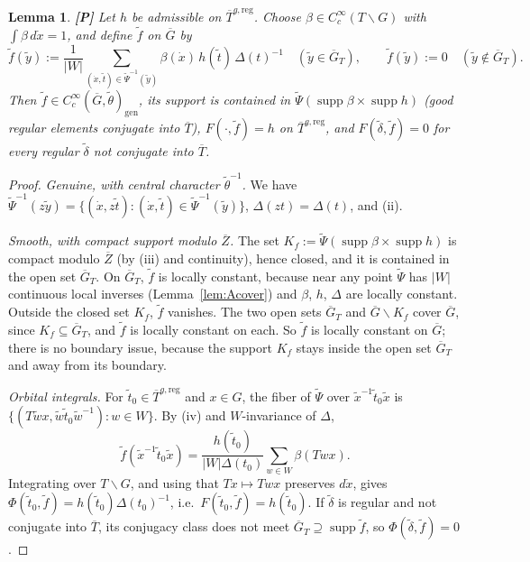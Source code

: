 \documentclass[12pt]{article}
\newcommand{\ov}[1]{\overline{#1}}
\newcommand{\gen}{\mathrm{gen}}
\newcommand{\reg}{\mathrm{reg}}
\newcommand{\supp}{\operatorname{supp}}
\newcommand{\Gb}{\ov{G}}
\newcommand{\Zb}{\ov{Z}}
\newcommand{\Tb}{\ov{T}}
\newcommand{\Pv}{\textbf{[P]}}
\theoremstyle{plain}
\newtheorem{lemma}[theorem]{Lemma}
\theoremstyle{definition}
\begin{document}
\begin{lemma}\label{lem:Arealize}\Pv
Let $h$ be admissible on $\Tb^{g,\reg}$. Choose $\beta\in C_c^\infty(T\backslash G)$ with $\int\beta\,d\dot x=1$, and define $\tilde f$ on $\Gb$ by
\[ \tilde f(\tilde y):=\frac1{|W|}\sum_{(\dot x,\tilde t)\in\tilde\Psi^{-1}(\tilde y)}\beta(\dot x)\,h(\tilde t)\,\Delta(t)^{-1}\quad(\tilde y\in\Gb_T),\qquad\tilde f(\tilde y):=0\quad(\tilde y\notin\Gb_T). \]
Then $\tilde f\in C_c^\infty(\Gb,\tilde\theta)_\gen$, its support is contained in $\tilde\Psi(\supp\beta\times\supp h)$ (good regular elements conjugate into $\Tb$), $F(\cdot,\tilde f)=h$ on $\Tb^{g,\reg}$, and $F(\tilde\delta,\tilde f)=0$ for every regular $\tilde\delta$ not conjugate into $\Tb$.
\end{lemma}
\begin{proof}
\emph{Genuine, with central character $\tilde\theta^{-1}$.} We have $\tilde\Psi^{-1}(z\tilde y)=\{(\dot x,z\tilde t):(\dot x,\tilde t)\in\tilde\Psi^{-1}(\tilde y)\}$, $\Delta(zt)=\Delta(t)$, and (ii).

\emph{Smooth, with compact support modulo $\Zb$.} The set $K_f:=\tilde\Psi(\supp\beta\times\supp h)$ is compact modulo $\Zb$ (by (iii) and continuity), hence closed, and it is contained in the open set $\Gb_T$. On $\Gb_T$, $\tilde f$ is locally constant, because near any point $\tilde\Psi$ has $|W|$ continuous local inverses (Lemma~\ref{lem:Acover}) and $\beta$, $h$, $\Delta$ are locally constant. Outside the closed set $K_f$, $\tilde f$ vanishes. The two open sets $\Gb_T$ and $\Gb\smallsetminus K_f$ cover $\Gb$, since $K_f\subseteq\Gb_T$, and $\tilde f$ is locally constant on each. So $\tilde f$ is locally constant on $\Gb$; there is no boundary issue, because the support $K_f$ stays inside the open set $\Gb_T$ and away from its boundary.

\emph{Orbital integrals.} For $\tilde t_0\in\Tb^{g,\reg}$ and $x\in G$, the fiber of $\tilde\Psi$ over $\tilde x^{-1}\tilde t_0\tilde x$ is $\{(T\tilde wx,\tilde w\tilde t_0\tilde w^{-1}):w\in W\}$. By (iv) and $W$-invariance of $\Delta$,
\[ \tilde f(\tilde x^{-1}\tilde t_0\tilde x)=\frac{h(\tilde t_0)}{|W|\Delta(t_0)}\sum_{w\in W}\beta(Twx). \]
Integrating over $T\backslash G$, and using that $Tx\mapsto Twx$ preserves $d\dot x$, gives $\Phi(\tilde t_0,\tilde f)=h(\tilde t_0)\Delta(t_0)^{-1}$, i.e.\ $F(\tilde t_0,\tilde f)=h(\tilde t_0)$. If $\tilde\delta$ is regular and not conjugate into $\Tb$, its conjugacy class does not meet $\Gb_T\supseteq\supp\tilde f$, so $\Phi(\tilde\delta,\tilde f)=0$.
\end{proof}
\end{document}
